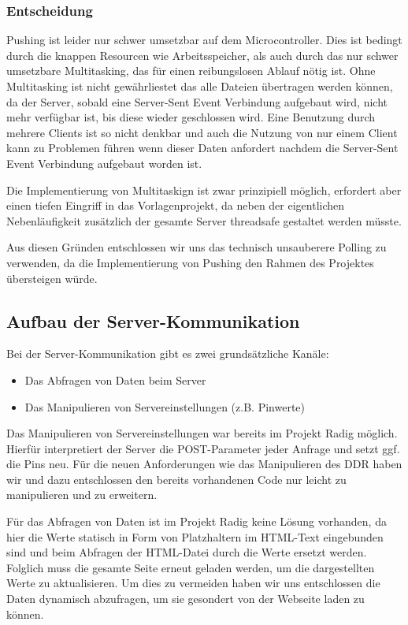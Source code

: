 \subsubsection{Entscheidung}
Pushing ist leider nur schwer umsetzbar auf dem Microcontroller. Dies ist
bedingt durch die knappen Resourcen wie Arbeitsspeicher, als auch durch das nur
schwer umsetzbare Multitasking, das für einen reibungslosen Ablauf nötig ist. Ohne Multitasking
ist nicht gewährliestet das alle Dateien übertragen werden können, da der
Server, sobald eine Server-Sent Event Verbindung aufgebaut wird, nicht mehr
verfügbar ist, bis diese wieder geschlossen wird. Eine Benutzung durch mehrere
Clients ist so nicht denkbar und auch die Nutzung von nur einem Client kann zu
Problemen führen wenn dieser Daten anfordert nachdem die Server-Sent Event
Verbindung aufgebaut worden ist.

Die Implementierung von Multitaskign ist zwar prinzipiell möglich, erfordert
aber einen tiefen Eingriff in das Vorlagenprojekt, da neben der eigentlichen
Nebenläufigkeit zusätzlich der gesamte Server threadsafe gestaltet werden
müsste.

Aus diesen Gründen entschlossen wir uns das technisch unsauberere Polling zu
verwenden, da die Implementierung von Pushing den Rahmen des Projektes
übersteigen würde.

\subsection{Aufbau der Server-Kommunikation}

Bei der Server-Kommunikation gibt es zwei grundsätzliche Kanäle:
\begin{itemize}
  \item Das Abfragen von Daten beim Server
  \item Das Manipulieren von Servereinstellungen (z.B. Pinwerte)
\end{itemize}
Das Manipulieren von Servereinstellungen war bereits im Projekt Radig möglich.
Hierfür interpretiert der Server die POST-Parameter jeder Anfrage und setzt ggf.
die Pins neu. Für die neuen Anforderungen wie das Manipulieren des DDR haben
wir und dazu entschlossen den bereits vorhandenen Code nur leicht zu
manipulieren und zu erweitern.

Für das Abfragen von Daten ist im Projekt Radig keine Lösung vorhanden, da hier
die Werte statisch in Form von Platzhaltern im HTML-Text eingebunden sind und
beim Abfragen der HTML-Datei durch die Werte ersetzt werden. Folglich muss die
gesamte Seite erneut geladen werden, um die dargestellten Werte zu
aktualisieren. Um dies zu vermeiden haben wir uns entschlossen die Daten
dynamisch abzufragen, um sie gesondert von der Webseite laden zu können.

